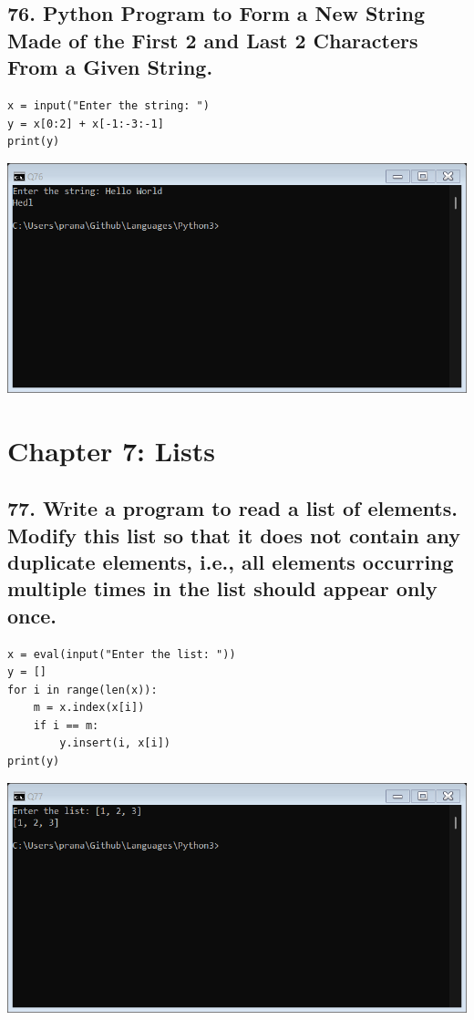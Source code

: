 \documentclass[12pt]{article}
\begin{document}
\subsection*{76. Python Program to Form a New String Made of the First 2 and Last 2 Characters From a Given String.}
\begin{verbatim}
x = input("Enter the string: ")
y = x[0:2] + x[-1:-3:-1]
print(y)
\end{verbatim}
\includegraphics[width=\linewidth]{images/76.png}

\section*{Chapter 7: Lists}

\subsection*{77. Write a program to read a list of elements. Modify this list so that it does not contain any duplicate elements, i.e., all elements occurring multiple times in the list should appear only once.}
\begin{verbatim}
x = eval(input("Enter the list: "))
y = []
for i in range(len(x)):
    m = x.index(x[i])
    if i == m:
        y.insert(i, x[i])
print(y)
\end{verbatim}
\includegraphics[width=\linewidth]{images/77.png}
\end{document}
